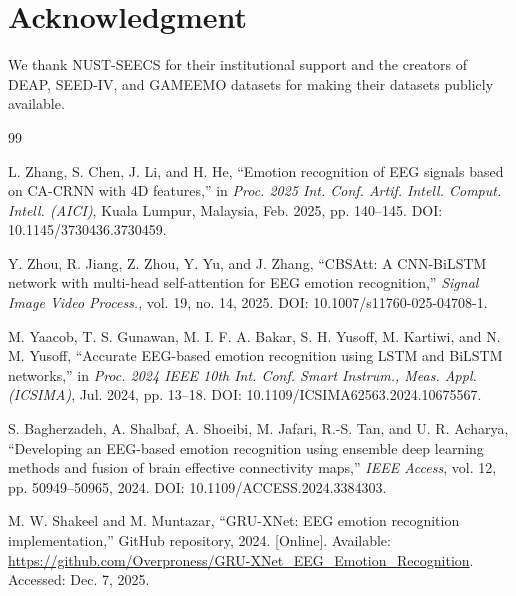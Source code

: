 \documentclass[conference]{IEEEtran}
\begin{document}
\section*{Acknowledgment}

We thank NUST-SEECS for their institutional support and the creators of DEAP, SEED-IV, and GAMEEMO datasets for making their datasets publicly available.


\begin{thebibliography}{99}

L. Zhang, S. Chen, J. Li, and H. He, ``Emotion recognition of EEG signals based on CA-CRNN with 4D features,'' in \textit{Proc. 2025 Int. Conf. Artif. Intell. Comput. Intell. (AICI)}, Kuala Lumpur, Malaysia, Feb. 2025, pp. 140--145. DOI: 10.1145/3730436.3730459.

Y. Zhou, R. Jiang, Z. Zhou, Y. Yu, and J. Zhang, ``CBSAtt: A CNN-BiLSTM network with multi-head self-attention for EEG emotion recognition,'' \textit{Signal Image Video Process.}, vol. 19, no. 14, 2025. DOI: 10.1007/s11760-025-04708-1.

M. Yaacob, T. S. Gunawan, M. I. F. A. Bakar, S. H. Yusoff, M. Kartiwi, and N. M. Yusoff, ``Accurate EEG-based emotion recognition using LSTM and BiLSTM networks,'' in \textit{Proc. 2024 IEEE 10th Int. Conf. Smart Instrum., Meas. Appl. (ICSIMA)}, Jul. 2024, pp. 13--18. DOI: 10.1109/ICSIMA62563.2024.10675567.

S. Bagherzadeh, A. Shalbaf, A. Shoeibi, M. Jafari, R.-S. Tan, and U. R. Acharya, ``Developing an EEG-based emotion recognition using ensemble deep learning methods and fusion of brain effective connectivity maps,'' \textit{IEEE Access}, vol. 12, pp. 50949--50965, 2024. DOI: 10.1109/ACCESS.2024.3384303.

M. W. Shakeel and M. Muntazar, ``GRU-XNet: EEG emotion recognition implementation,'' GitHub repository, 2024. [Online]. Available: \url{https://github.com/Overproness/GRU-XNet_EEG_Emotion_Recognition}. Accessed: Dec. 7, 2025.

\end{thebibliography}
\end{document}

